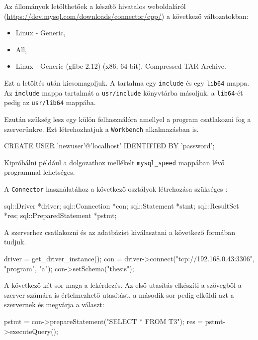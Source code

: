 
Az állományok letölthetőek a készítő hivatalos weboldaláról (\url{https://dev.mysql.com/downloads/connector/cpp/}) a következő változatokban:
\begin{itemize}
	\item Linux - Generic,
	\item All,
	\item Linux - Generic (glibc 2.12) (x86, 64-bit), Compressed TAR Archive.
\end{itemize}
Ezt a letöltés után kicsomagoljuk. A tartalma egy \texttt{include} és egy \texttt{lib64} mappa. Az \texttt{include} mappa tartalmát a \texttt{usr/include} könyvtárba másoljuk, a \texttt{lib64}-ét pedig az \texttt{usr/lib64} mappába.

Ezután szükség lesz egy külön felhasználóra amellyel a program csatlakozni fog a szerverünkre. Ezt létrehozhatjuk a \texttt{Workbench} alkalmazásban is.
\begin{python}
CREATE USER 'newuser'@'localhost' IDENTIFIED BY 'password';
\end{python}


Kipróbálni például a dolgozathoz mellékelt \texttt{mysql\_speed} mappában lévő programmal lehetséges.
 
A \texttt{Connector} használatához a következő osztályok létrehozása szükséges \cite{connector_program}:
\begin{cpp}
sql::Driver *driver;
sql::Connection *con;
sql::Statement *stmt;
sql::ResultSet *res;
sql::PreparedStatement *pstmt;
\end{cpp}
A szerverhez csatlakozni és az adatbázist kiválasztani a következő formában tudjuk.
\begin{cpp}
driver = get_driver_instance();
con = driver->connect("tcp://192.168.0.43:3306", "program", "a");
con->setSchema("thesis");
\end{cpp}
A következő két sor maga a lekérdezés. Az első utasítás elkészíti a szövegből a szerver számára is értelmezhető utasítást, a második sor pedig elküldi azt a szervernek és megvárja a választ:
\begin{cpp}
pstmt = con->prepareStatement("SELECT * FROM T3");
res = pstmt->executeQuery();
\end{cpp}

